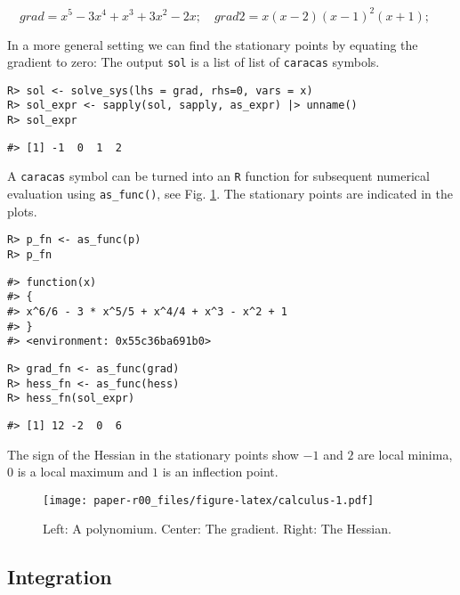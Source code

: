 \[
 grad  = x^{5} - 3 x^{4} + x^{3} + 3 x^{2} - 2 x; \quad 
 grad2  = x \left(x - 2\right) \left(x - 1\right)^{2} \left(x + 1\right); \quad  
\]

In a more general setting we can find the stationary points by equating the gradient to zero:
The output \texttt{sol} is a list of list of \texttt{caracas} symbols.

\begin{verbatim}
R> sol <- solve_sys(lhs = grad, rhs=0, vars = x) 
R> sol_expr <- sapply(sol, sapply, as_expr) |> unname()
R> sol_expr
\end{verbatim}

\begin{verbatim}
#> [1] -1  0  1  2
\end{verbatim}

A \texttt{caracas} symbol can be turned into an \texttt{R} function for subsequent
numerical evaluation using \texttt{as\_func()}, see
Fig. \ref{fig:calculus}.
The stationary points are indicated in the plots.

\begin{verbatim}
R> p_fn <- as_func(p)
R> p_fn
\end{verbatim}

\begin{verbatim}
#> function(x)
#> { 
#> x^6/6 - 3 * x^5/5 + x^4/4 + x^3 - x^2 + 1
#> }
#> <environment: 0x55c36ba691b0>
\end{verbatim}

\begin{verbatim}
R> grad_fn <- as_func(grad)
R> hess_fn <- as_func(hess)
R> hess_fn(sol_expr)
\end{verbatim}

\begin{verbatim}
#> [1] 12 -2  0  6
\end{verbatim}

The sign of the Hessian in the stationary
points show \(-1\) and \(2\) are local minima, \(0\) is a local maximum and
\(1\) is an inflection point.

\begin{figure}
\centering
\texttt{[image: paper-r00\_files/figure-latex/calculus-1.pdf]}
\caption{\label{fig:calculus}Left: A polynomium. Center: The gradient. Right: The Hessian.}
\end{figure}

\hypertarget{integration}{%
\subsection{Integration}\label{integration}}

